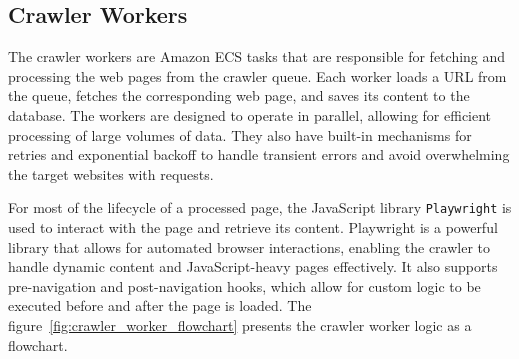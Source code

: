 \subsection{Crawler Workers}\label{subsec:crawler-workers}
The crawler workers are Amazon ECS tasks that are responsible for fetching and processing the web pages from the crawler queue.
Each worker loads a URL from the queue, fetches the corresponding web page, and saves its content to the database.
The workers are designed to operate in parallel, allowing for efficient processing of large volumes of data.
They also have built-in mechanisms for retries and exponential backoff to handle transient errors and avoid overwhelming the target websites with requests.

For most of the lifecycle of a processed page, the JavaScript library \texttt{Playwright} is used to interact with the page and retrieve its content.
Playwright is a powerful library that allows for automated browser interactions, enabling the crawler to handle dynamic content and JavaScript-heavy pages effectively.
It also supports pre-navigation and post-navigation hooks, which allow for custom logic to be executed before and after the page is loaded.
The figure~\ref{fig:crawler_worker_flowchart} presents the crawler worker logic as a flowchart.


